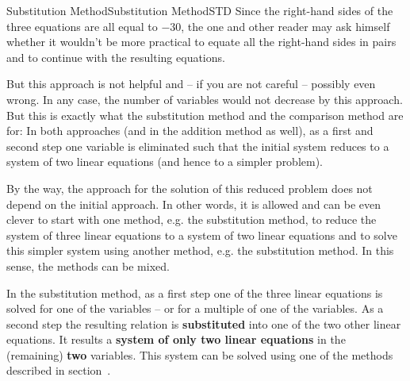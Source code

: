 \begin{MXContent}{Substitution Method}{Substitution Method}{STD}
Since the right-hand sides of the three equations are all equal to $- 30$,
the one and other reader may ask himself whether it wouldn't be more practical
to equate all the right-hand sides in pairs and to continue with the resulting equations.

But this approach is not helpful and -- if you are not careful -- possibly even wrong.
In any case, the number of variables would not decrease by this approach. But this is exactly 
what the substitution method and the comparison method are for: In both approaches (and
in the addition method as well), as a first and second step one variable is eliminated such 
that the initial system reduces to a system of two linear equations (and hence to a
simpler problem).

By the way, the approach for the solution of this reduced problem does not depend on the 
initial approach. In other words, it is allowed and can be even clever to start with one 
method, e.g. the substitution method, to reduce the system of three linear equations to 
a system of two linear equations and to solve this simpler system using another 
method, e.g. the substitution method. In this sense, the methods can be mixed.


\begin{MInfo}
In the substitution method, as a first step one of the three linear equations is solved 
for one of the variables -- or for a multiple of one of the variables. As a second step
the resulting relation is \textbf{substituted} into one of the two other linear equations.
It results a \textbf{system of only two linear equations} in the (remaining) \textbf{two}
variables. This system can be solved using one of the methods described in 
section~.
\end{MInfo}
\end{MXContent}

